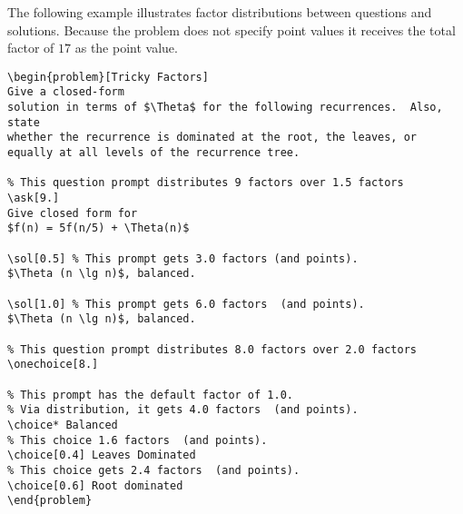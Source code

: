 \begin{cluster}
\label{grp:xmpl:quiz::illustrates}

\begin{example}
\label{xmpl:quiz::illustrates}
The following example illustrates factor distributions between
questions and solutions.  Because the problem does not specify point
values it receives the total factor of $17$ as the point value.
\begin{lstlisting}
\begin{problem}[Tricky Factors]
Give a closed-form
solution in terms of $\Theta$ for the following recurrences.  Also, state
whether the recurrence is dominated at the root, the leaves, or
equally at all levels of the recurrence tree.

% This question prompt distributes 9 factors over 1.5 factors
\ask[9.]
Give closed form for  
$f(n) = 5f(n/5) + \Theta(n)$

\sol[0.5] % This prompt gets 3.0 factors (and points).
$\Theta (n \lg n)$, balanced.

\sol[1.0] % This prompt gets 6.0 factors  (and points).
$\Theta (n \lg n)$, balanced.

% This question prompt distributes 8.0 factors over 2.0 factors 
\onechoice[8.] 

% This prompt has the default factor of 1.0.
% Via distribution, it gets 4.0 factors  (and points). 
\choice* Balanced 
% This choice 1.6 factors  (and points).
\choice[0.4] Leaves Dominated  
% This choice gets 2.4 factors  (and points).
\choice[0.6] Root dominated   
\end{problem}
\end{lstlisting}

\end{example}
\end{cluster}

